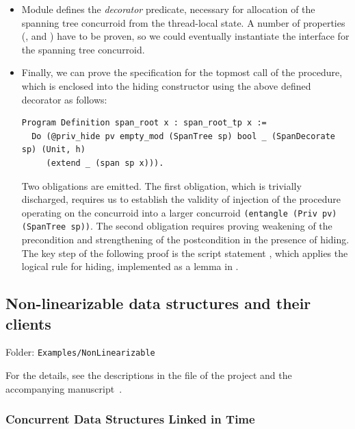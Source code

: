 \begin{itemize}
\item Module  defines the \emph{decorator}
  predicate, necessary for allocation of the spanning tree concurroid
  from the thread-local state. A number of properties (\eg,
   and ) have to be proven, so we could
  eventually instantiate the  interface for the
  spanning tree concurroid.

\item Finally, we can prove the specification  for
  the topmost call of the  procedure, which is enclosed
  into the hiding constructor using the above defined decorator as
  follows:

\begin{lstlisting}
Program Definition span_root x : span_root_tp x := 
  Do (@priv_hide pv empty_mod (SpanTree sp) bool _ (SpanDecorate sp) (Unit, h) 
     (extend _ (span sp x))).    
\end{lstlisting}

Two obligations are emitted. The first obligation, which is trivially
discharged, requires us to establish the validity of injection of the
procedure  operating on the concurroid 
into a larger concurroid \texttt{\small(entangle (Priv pv) (SpanTree
  sp))}. The second obligation requires proving weakening of the
precondition and strengthening of the postcondition in the presence of
hiding. The key step of the following proof is the script statement
, which applies the logical rule for
hiding, implemented as a lemma in
. %

\end{itemize}

\subsection{Non-linearizable data structures and their clients}
\label{sec-nonlinaerizable}

Folder: \texttt{Examples/NonLinearizable}

For the details, see the descriptions in the  file of
the project and the accompanying manuscript~\cite{Sergey-al:OOPSLA16}.

\subsubsection{Concurrent Data Structures Linked in Time}
\label{sec-relink}

